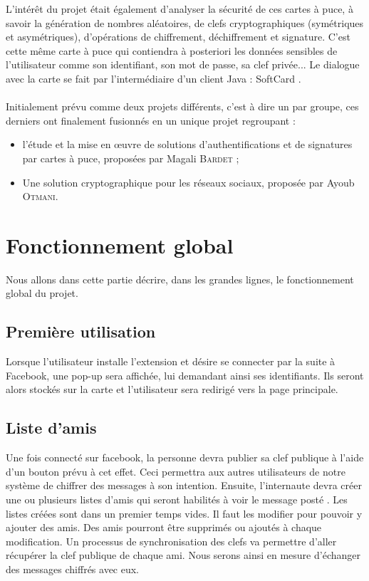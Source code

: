 \documentclass[a4paper,11pt,french]{article}
\begin{document}
L'intérêt du projet était également d'analyser la sécurité de ces cartes à puce,
à savoir la génération de nombres aléatoires, de clefs cryptographiques 
(symétriques et asymétriques), d'opérations de chiffrement, déchiffrement et
signature. C'est cette même carte à puce qui contiendra à posteriori les données
sensibles de l’utilisateur comme son identifiant, son mot de passe, sa clef
privée... Le dialogue avec la carte se fait par l’intermédiaire d’un client
Java : \og{}SoftCard \fg{}. 

\paragraph{}
Initialement prévu comme deux projets différents, c'est à dire un par groupe,
ces derniers ont finalement fusionnés en un unique projet regroupant :
\begin{itemize}
    \item l'étude et la mise en \oe{}uvre de solutions d’authentifications et 
        de signatures par cartes à puce, proposées par Magali \textsc{Bardet} ;
    \item Une solution cryptographique pour les réseaux sociaux, proposée par
	Ayoub \textsc{Otmani}.
\end{itemize}

\section{Fonctionnement global}
Nous allons dans cette partie décrire, dans les grandes lignes, le 
fonctionnement global du projet.

\subsection{Première utilisation}
Lorsque l'utilisateur installe l'extension et désire se connecter par la suite
à Facebook, une \og pop-up \fg{} sera affichée, lui demandant ainsi ses
identifiants. Ils seront alors stockés sur la carte et l'utilisateur sera
redirigé vers la page principale.

\subsection{Liste d'amis}
Une fois connecté sur facebook, la personne devra publier sa clef publique
à l'aide d'un bouton prévu à cet effet. Ceci permettra aux autres utilisateurs
de notre système de chiffrer des messages à son intention. Ensuite, l'internaute
devra créer une ou plusieurs listes d'amis qui seront habilités à voir le
message \og posté \fg{}. Les listes créées sont dans un premier temps vides.
Il faut les modifier pour pouvoir y ajouter des amis. Des amis pourront être
supprimés ou ajoutés à chaque modification. Un processus de synchronisation
des clefs va permettre d'aller récupérer la clef publique de chaque ami. Nous
serons ainsi en mesure d'échanger des messages chiffrés avec eux.
\end{document}
